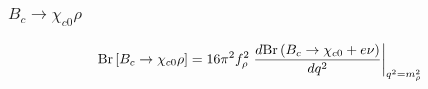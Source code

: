 \documentclass{beamer}
\begin{document}
\begin{frame}[t]
\begin{columns}
\begin{column}{0.5\textwidth}
    \end{column}
  \end{columns}
\end{frame}

\begin{frame}
  \frametitle{$B_c \to \chi_{c0} \rho$}
  $$
  \mathrm{Br}\left[B_c \to \chi_{c0} \rho\right] =
  16\pi^2 f_\rho^2 \left.
    \frac{d\mathrm{Br}\left(B_c\to\chi_{c0}+e\nu\right)}{dq^2}
  \right|_{q^2=m_\rho^2}
  $$
  \begin{columns}
    \begin{column}{0.5\textwidth}
      \vspace{3mm}
      
    \end{column}
  \begin{column}{0.5\textwidth}
      \\
      \vspace{3mm}
      
       \end{column}
\end{columns}
\end{frame}
\end{document}
